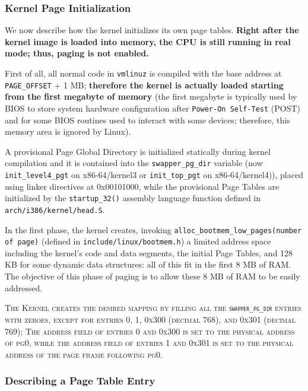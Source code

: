 \documentclass[10pt,a4paper]{article}
\begin{document}
\subsubsection{Kernel Page Initialization}

We now describe how the kernel initializes its own page tables. \textbf{Right after the kernel image is loaded into memory, the CPU is still running in real mode; thus, paging is not enabled.}

First of all, all normal code in \texttt{vmlinuz} is compiled with the base address at \texttt{PAGE\_OFFSET} + 1 MB; \textbf{therefore the kernel is actually loaded starting from the first megabyte of memory} (the first megabyte is typically used by BIOS to store system hardware configuration after \texttt{Power-On Self-Test} (POST) and for some BIOS routines used to interact with some devices; therefore, this memory area is ignored by Linux).

A provisional Page Global Directory is initialized statically during kernel compilation and it is contained into the \texttt{swapper\_pg\_dir} variable (now \texttt{init\_level4\_pgt} on x86-64/kernel3 or \texttt{init\_top\_pgt} on x86-64/kernel4)), placed using linker directives at 0x00101000, while the provisional Page Tables are initialized by the \texttt{startup\_32()} assembly language function defined in \texttt{arch/i386/kernel/head.S}. 

In the first phase, the kernel creates, invoking \texttt{alloc\_bootmem\_low\_pages(number of page)} (defined in \texttt{include/linux/bootmem.h}) a limited address space including the kernel's code and data segments, the initial Page Tables, and 128 KB for some dynamic data structures: all of this fit in the first 8 MB of RAM. The objective of this phase of paging is to allow these 8 MB of RAM to be easily addressed.

\textsc{The Kernel creates the desired mapping by filling all the \texttt{swapper\_pg\_dir} entries with zeroes, except for entries 0, 1, 0x300 (decimal 768), and 0x301 (decimal 769);   The address field of entries 0 and 0x300 is set to the physical address of pg0, while the address field of entries 1 and 0x301 is set to the physical address of the page frame following pg0.}




\subsubsection{Describing a Page Table Entry}
\end{document}
